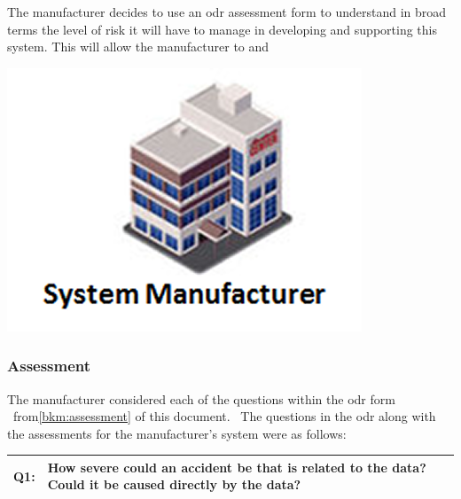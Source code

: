 %
%
\begin{minipage}[t][2cm]{0.73\textwidth}
  The manufacturer decides to use an \gls{odr} assessment form to understand in broad terms the level of risk it will have to manage in developing and supporting this system. This will allow the manufacturer to  and 
\end{minipage}
\begin{minipage}[c][1cm]{0.25\textwidth}
	\vspace{1cm}
  \centering
    \includegraphics[width=\textwidth]{images/manufacturer}
\end{minipage}

\subsubsection{ Assessment}
The manufacturer considered each of the questions within the \gls{odr} form \cbstart\ from\cbend\autoref{bkm:assessment} of this document.
\cbstart\ The questions in the \gls{odr} along with the assessments for the manufacturer's system were as follows:\cbend\

\begin{longtable*}[H]
  {|L{}|L{}|}
  \hline
  Q1: & How severe could an accident be that is related to the data? Could it be caused directly by the data?\\
  \hline
\end{longtable*}

